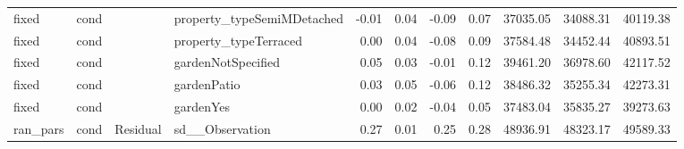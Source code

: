 \begin{table}[ht]
\begin{tabular}{llllrrrrrrr}
  fixed & cond &  & property\_typeSemiMDetached & -0.01 & 0.04 & -0.09 & 0.07 & 37035.05 & 34088.31 & 40119.38 \\ 
  fixed & cond &  & property\_typeTerraced & 0.00 & 0.04 & -0.08 & 0.09 & 37584.48 & 34452.44 & 40893.51 \\ 
  fixed & cond &  & gardenNotSpecified & 0.05 & 0.03 & -0.01 & 0.12 & 39461.20 & 36978.60 & 42117.52 \\ 
  fixed & cond &  & gardenPatio & 0.03 & 0.05 & -0.06 & 0.12 & 38486.32 & 35255.34 & 42273.31 \\ 
  fixed & cond &  & gardenYes & 0.00 & 0.02 & -0.04 & 0.05 & 37483.04 & 35835.27 & 39273.63 \\ 
  ran\_pars & cond & Residual & sd\_\_Observation & 0.27 & 0.01 & 0.25 & 0.28 & 48936.91 & 48323.17 & 49589.33 \\ 
   \hline
\end{tabular}
\end{table}

